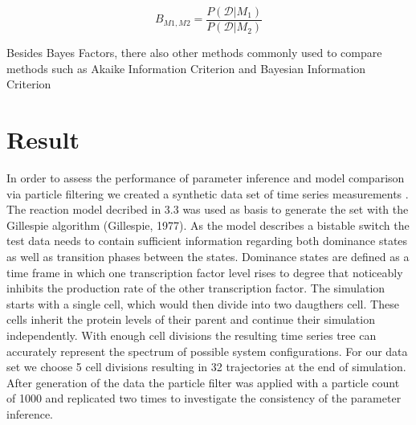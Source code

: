 \documentclass{bioinfo}
\begin{document}
\begin{equation}
B_{M1, M2} = \frac{P(\mathcal{D} | M_1)}{P(\mathcal{D} | M_2)}\label{eq:29}
\end{equation}

Besides Bayes Factors, there also other methods commonly used to compare methods such as Akaike Information Criterion and Bayesian Information Criterion \citep{PosadaBuckley14, Bozdogan87}

\section{Result}

In order to assess the performance of parameter inference and model comparison via particle filtering we created a synthetic data set of time series measurements	. The reaction model decribed in 3.3 was used as basis to generate the set with the Gillespie algorithm (Gillespie, 1977). As the model describes a bistable switch the test data needs to contain sufficient information regarding both dominance states as well as transition phases between the states. Dominance states are defined as a time frame in which one transcription factor level rises to degree that noticeably inhibits the production rate of the other transcription factor. The simulation starts with a single cell, which would then divide into two daugthers cell. These cells inherit the protein levels of their parent and continue their simulation independently. With enough cell divisions the resulting time series tree can accurately represent the spectrum of possible system configurations. For our data set we choose 5 cell divisions resulting in 32 trajectories at the end of simulation. After generation of the data the particle filter was applied with a particle count of 1000 and replicated two times to investigate the consistency of the parameter inference.
\end{document}
